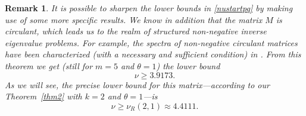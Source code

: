 \documentclass[smallextended,numbook,runningheads]{svjour3}     %
\newtheorem{remark}{Remark}
\newtheorem{remark}{Remark}
\newcommand{\te}{\theta}
\newcommand{\nplus}{\mathbb{N}^+}
\begin{document}
\begin{remark}

It is possible to sharpen the lower bounds in \eqref{nustartpq} by making use of some more specific results. 
We know in addition that the matrix $M$ is \emph{circulant}, which leads us to the realm of 
\emph{structured non-negative inverse eigenvalue problems}. For example, 
the spectra of non-negative circulant matrices have been characterized (with a necessary \emph{and} sufficient condition) in \cite[Theorem 10]{rojosoto}. From this theorem we get (still for $m=5$ and $\te=1$) the lower bound
\[
\nu\ge 3.9173.
\]
As we will see, the precise lower bound for this matrix---according to our Theorem~\ref{thm2} with $k=2$ and $\te=1$---is
\[
\nu\ge \nu_R(2,1)\approx 4.4111.
\]
\end{remark}
\end{document}
